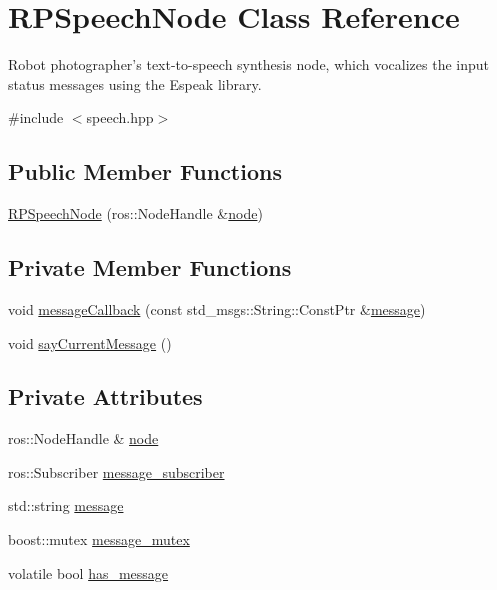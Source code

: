 \hypertarget{class_r_p_speech_node}{\section{\-R\-P\-Speech\-Node \-Class \-Reference}
\label{class_r_p_speech_node}
}


\-Robot photographer's text-\/to-\/speech synthesis node, which vocalizes the input status messages using the \-Espeak library.  




{\ttfamily \#include $<$speech.\-hpp$>$}

\subsection*{\-Public \-Member \-Functions}
\begin{DoxyCompactItemize}
\item 
\hyperlink{class_r_p_speech_node_afc9ddbe49512e4e33cd2293ff5345612}{\-R\-P\-Speech\-Node} (ros\-::\-Node\-Handle \&\hyperlink{class_r_p_speech_node_a362cd1f0bb881c0dfc2fed8c9d21250c}{node})
\end{DoxyCompactItemize}
\subsection*{\-Private \-Member \-Functions}
\begin{DoxyCompactItemize}
\item 
void \hyperlink{class_r_p_speech_node_ad1f694d1dc98a8438982cd57105e2859}{message\-Callback} (const std\-\_\-msgs\-::\-String\-::\-Const\-Ptr \&\hyperlink{class_r_p_speech_node_a2b2d778809c22cc4e94d7169ee84fe8c}{message})
\item 
void \hyperlink{class_r_p_speech_node_aeacf95ab08ca4a4bd3b06cacec6a5131}{say\-Current\-Message} ()
\end{DoxyCompactItemize}
\subsection*{\-Private \-Attributes}
\begin{DoxyCompactItemize}
\item 
ros\-::\-Node\-Handle \& \hyperlink{class_r_p_speech_node_a362cd1f0bb881c0dfc2fed8c9d21250c}{node}
\item 
ros\-::\-Subscriber \hyperlink{class_r_p_speech_node_acf4df4dff2ce25e1faf20b3285ff9336}{message\-\_\-subscriber}
\item 
std\-::string \hyperlink{class_r_p_speech_node_a2b2d778809c22cc4e94d7169ee84fe8c}{message}
\item 
boost\-::mutex \hyperlink{class_r_p_speech_node_a3238569cd6c25aa4768e78b390fbb8f8}{message\-\_\-mutex}
\item 
volatile bool \hyperlink{class_r_p_speech_node_abde38eab3c8c480a7ab36d9b647da471}{has\-\_\-message}
\end{DoxyCompactItemize}


